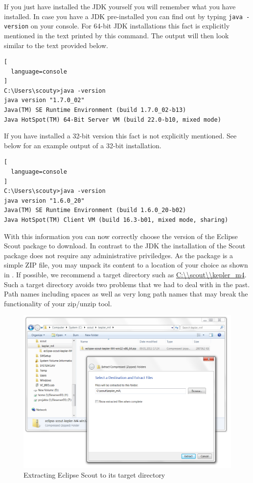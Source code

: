 \documentclass[a4paper,10pt,twoside]{book}
\begin{document}
If you just have installed the JDK yourself you will remember what you have installed. 
In case you have a JDK pre-installed you can find out by typing \texttt{java -version} on your console.
For 64-bit JDK installations this fact is explicitly mentioned in the text printed by this command.
The output will then look similar to the text provided below.

\begin{lstlisting}[
  language=console
]
C:\Users\scouty>java -version
java version "1.7.0_02"
Java(TM) SE Runtime Environment (build 1.7.0_02-b13)
Java HotSpot(TM) 64-Bit Server VM (build 22.0-b10, mixed mode)
\end{lstlisting}

If you have installed a 32-bit version this fact is not explicitly mentioned.
See below for an example output of a 32-bit installation.

\begin{lstlisting}[
  language=console
]
C:\Users\scouty>java -version
java version "1.6.0_20"
Java(TM) SE Runtime Environment (build 1.6.0_20-b02)
Java HotSpot(TM) Client VM (build 16.3-b01, mixed mode, sharing)
\end{lstlisting}

With this information you can now correctly choose the version of the Eclipse Scout package to download.
In contrast to the JDK the installation of the Scout package does not require any administrative priviledges.
As the package is a simple ZIP file, you may unpack its content to a location of your choice as shown in . 
If possible, we recommend a target directory such as 
\url{C:\\scout\\kepler_m4}.
Such a target directory avoids two problems that we had to deal with in the past.
Path names including spaces as well as very long path names that may break the functionality of your zip/unzip tool.

\begin{figure}
\includegraphics[width=15cm]{scout_extract_zip.png}
\caption{Extracting Eclipse Scout to its target directory}
\end{figure}
\end{document}
